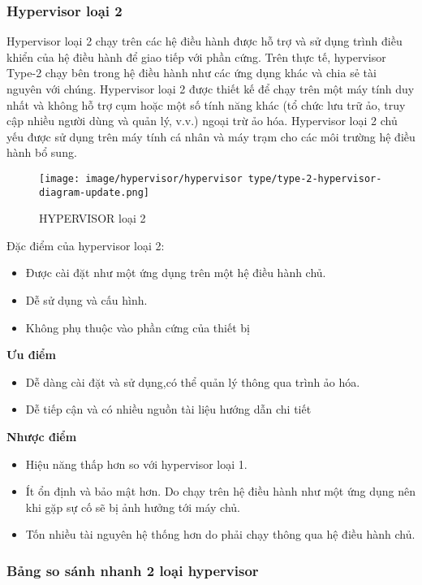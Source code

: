 \documentclass[a4paper,12pt]{article}
\begin{document}
\subsubsection{Hypervisor loại 2}
Hypervisor loại 2 chạy trên các hệ điều hành được hỗ trợ và sử dụng trình điều khiển của hệ điều hành để giao tiếp
với phần cứng. Trên thực tế, hypervisor Type-2 chạy bên trong hệ điều hành như các ứng dụng khác và chia sẻ tài
nguyên với chúng. Hypervisor loại 2 được thiết kế để chạy trên một máy tính duy nhất và không hỗ trợ cụm hoặc
một số tính năng khác (tổ chức lưu trữ ảo, truy cập nhiều người dùng và quản lý, v.v.) ngoại trừ ảo hóa. Hypervisor
loại 2 chủ yếu được sử dụng trên máy tính cá nhân và máy trạm cho các môi trường hệ điều hành bổ sung.


\begin{figure}[h]
    \centering
    \texttt{[image: image/hypervisor/hypervisor type/type-2-hypervisor-diagram-update.png]}
    \caption{HYPERVISOR loại 2}
    \label{}
\end{figure}





Đặc điểm của hypervisor loại 2:
\begin{itemize}
\item Được cài đặt như một ứng dụng trên một hệ điều hành chủ.
\item Dễ sử dụng và cấu hình.
\item Không phụ thuộc vào phần cứng của thiết bị    
\end{itemize}

\textbf{Ưu điểm} 
\begin{itemize}
\item Dễ dàng cài đặt và sử dụng,có thể quản lý thông qua trình ảo hóa. 
\item Dễ  tiếp cận và có nhiều nguồn tài liệu hướng dẫn chi tiết
\end{itemize}

\textbf{Nhược điểm}
\begin{itemize}
\item Hiệu năng thấp hơn so với hypervisor loại 1.
\item Ít ổn định và bảo mật hơn. Do chạy trên hệ điều hành như một ứng dụng nên khi gặp sự cố  sẽ bị ảnh hưởng tới máy chủ.
\item Tốn nhiều tài nguyên hệ thống hơn do phải chạy thông qua hệ điều hành chủ.
\end{itemize}
\subsubsection{ Bảng so sánh nhanh 2 loại hypervisor}
\end{document}
